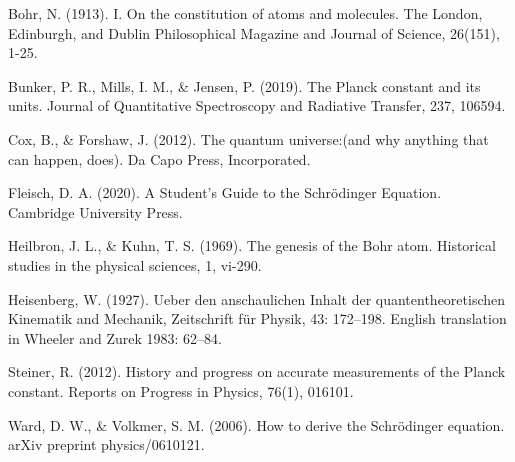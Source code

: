 \documentclass[letter]{article}
\begin{document}
    \begin{thebibliography}{0}
    
        Bohr, N. (1913). I. On the constitution of atoms and molecules. The London, Edinburgh, and Dublin Philosophical Magazine and Journal of Science, 26(151), 1-25.

        Bunker, P. R., Mills, I. M., \& Jensen, P. (2019). The Planck constant and its units. Journal of Quantitative Spectroscopy and Radiative Transfer, 237, 106594.
        
        Cox, B., \& Forshaw, J. (2012). The quantum universe:(and why anything that can happen, does). Da Capo Press, Incorporated.
            
        Fleisch, D. A. (2020). A Student's Guide to the Schrödinger Equation. Cambridge University Press.
        
        Heilbron, J. L., & Kuhn, T. S. (1969). The genesis of the Bohr atom. Historical studies in the physical sciences, 1, vi-290.
        
        Heisenberg, W. (1927). Ueber den anschaulichen Inhalt der quantentheoretischen Kinematik and Mechanik, Zeitschrift für Physik, 43: 172–198. English translation in Wheeler and Zurek 1983: 62–84.
        
        Steiner, R. (2012). History and progress on accurate measurements of the Planck constant. Reports on Progress in Physics, 76(1), 016101.
              
        Ward, D. W., \& Volkmer, S. M. (2006). How to derive the Schrödinger equation. arXiv preprint physics/0610121.
  
    \end{thebibliography}
\end{document}
